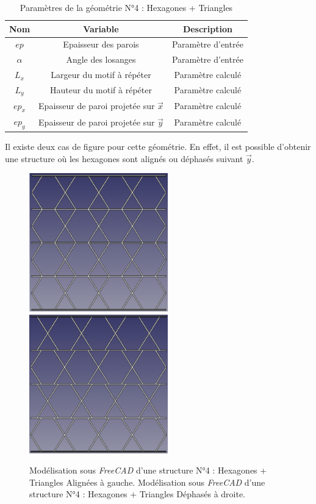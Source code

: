 \documentclass[a4paper]{article}
\begin{document}
	\begin{table}[h]
		\centering
		\begin{tabular}{|c|c|c|}
			\hline
			\rowcolor{Gray}
			\textbf{Nom} & \textbf{Variable} & \textbf{Description} \\
			\hline\hline 
			$ep$ & Epaisseur des parois & Paramètre d'entrée \\
			$\alpha$ & Angle des losanges & Paramètre d'entrée \\
			$L_x$ & Largeur du motif à répéter & Paramètre calculé \\
			$L_y$ & Hauteur du motif à répéter & Paramètre calculé \\
			$ep_x$ & Epaisseur de paroi projetée sur $\vec{x}$ & Paramètre calculé \\
			$ep_y$ & Epaisseur de paroi projetée sur $\vec{y}$ & Paramètre calculé \\
			\hline
		\end{tabular}
		\caption{Paramètres de la géométrie N°4 : Hexagones + Triangles}
	\end{table}
	
	Il existe deux cas de figure pour cette géométrie. En effet, il est possible d’obtenir une structure où les hexagones sont alignés ou déphasés suivant $\vec{y}$.
	
	\begin{figure}[H]
		\centering
		\includegraphics[width=6cm]{Images/5/Freecad_hexagones_alignes.png}
		\includegraphics[width=6cm]{Images/5/Freecad_hexagones_dephases.png}
		\caption{Modélisation sous \textit{FreeCAD} d’une structure N°4 : Hexagones + Triangles Alignées à gauche. Modélisation sous \textit{FreeCAD} d’une structure N°4 : Hexagones + Triangles Déphasés à droite.}
	\end{figure}
	\newpage
	
\end{document}
